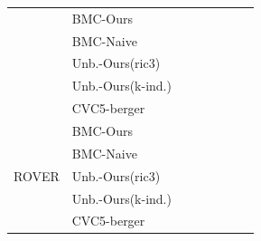 \begin{table}[htb]
\begin{tabular}{ll rrrrrr}
  & BMC-Ours          & \SextZextInstcombineNumProblemsTotal{} & \textbf{\SextZextInstcombineNumSolvedMbmc{}} & \SextZextInstcombineNumTimeoutMbmc{}          & \textbf{\SextZextInstcombineNumMemoutMbmc{}} & \textbf{\SextZextInstcombineNumUnknownMbmc{}} & \SextZextInstcombineGeomeanMsMbmc{} \\
  & BMC-Naive         & \SextZextInstcombineNumProblemsTotal{} & \SextZextInstcombineNumSolvedNbmc{}          & \SextZextInstcombineNumTimeoutNbmc{}          & \SextZextInstcombineNumMemoutNbmc{}          & \textbf{\SextZextInstcombineNumUnknownNbmc{}} & \SextZextInstcombineGeomeanMsNbmc{} \\
  & Unb.-Ours(ric3)   & \SextZextInstcombineNumProblemsTotal{} & \SextZextInstcombineNumSolvedMr{}            & \textbf{\SextZextInstcombineNumTimeoutMr{}}   & \textbf{\SextZextInstcombineNumMemoutMr{}}   & \SextZextInstcombineNumUnknownMr{} & \SextZextInstcombineGeomeanMsMr{} \\
  & Unb.-Ours(k-ind.) & \SextZextInstcombineNumProblemsTotal{} & \SextZextInstcombineNumSolvedMk{}            & \textbf{\SextZextInstcombineNumTimeoutMk{}}   & \textbf{\SextZextInstcombineNumMemoutMk{}}   & \SextZextInstcombineNumUnknownMk{} & \SextZextInstcombineGeomeanMsMk{} \\
  & CVC5-berger         & \SextZextInstcombineNumProblemsTotal{} & \SextZextInstcombineNumSolvedC{}             & \SextZextInstcombineNumTimeoutC{}             & \textbf{\SextZextInstcombineNumMemoutC{}}    & \SextZextInstcombineNumUnknownC{} & \textbf{\SextZextInstcombineGeomeanMsC{}} \\
\midrule
\multirow{5}{*}{ROVER}
  & BMC-Ours          & \RoverCactusNumProblemsTotal{} & \textbf{\RoverCactusNumSolvedMbmc{}} & \RoverCactusNumTimeoutMbmc{}          & \textbf{\RoverCactusNumMemoutMbmc{}} & \textbf{\RoverCactusNumUnknownMbmc{}} & \RoverCactusGeomeanMsMbmc{} \\
  & BMC-Naive         & \RoverCactusNumProblemsTotal{} & \RoverCactusNumSolvedNbmc{}          & \textbf{\RoverCactusNumTimeoutNbmc{}} & \RoverCactusNumMemoutNbmc{}          & \textbf{\RoverCactusNumUnknownNbmc{}} & \RoverCactusGeomeanMsNbmc{} \\
  & Unb.-Ours(ric3)   & \RoverCactusNumProblemsTotal{} & \RoverCactusNumSolvedMr{}            & \textbf{\RoverCactusNumTimeoutMr{}}   & \textbf{\RoverCactusNumMemoutMr{}}   & \RoverCactusNumUnknownMr{} & \RoverCactusGeomeanMsMr{} \\
  & Unb.-Ours(k-ind.) & \RoverCactusNumProblemsTotal{} & \RoverCactusNumSolvedMk{}            & \textbf{\RoverCactusNumTimeoutMk{}}   & \textbf{\RoverCactusNumMemoutMk{}}   & \RoverCactusNumUnknownMk{} & \RoverCactusGeomeanMsMk{} \\
  & CVC5-berger         & \RoverCactusNumProblemsTotal{} & \RoverCactusNumSolvedC{}             & \RoverCactusNumTimeoutC{}             & \textbf{\RoverCactusNumMemoutC{}}    & \RoverCactusNumUnknownC{} & \textbf{\RoverCactusGeomeanMsC{}} \\
\bottomrule
\end{tabular}
\end{table}

